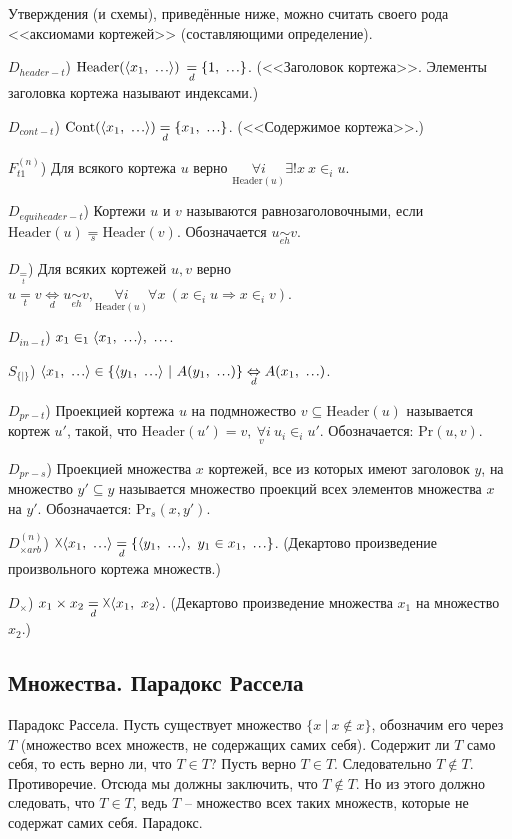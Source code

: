 \documentclass[a4paper]{article}
\newcommand\mydots{\hbox to 1em{.\hss.\hss.}}
\newcommand{\Def}[0]{\underset{d}{\Leftrightarrow}}
\newcommand{\defeq}[0]{\underset{d}{=}}
\newcommand{\eqs}[0]{\underset{s}{=}} %
\newcommand{\eqt}[0]{\underset{t}{=}} %
\newcommand{\Header}[1]{\mathrm{Header}(#1)}
\newcommand{\Cont}[1]{\mathrm{Cont}(#1)}
\newcommand{\Prmy}[2]{\mathrm{Pr}(#1, #2)}
\newcommand{\Prmys}[2]{\mathrm{Pr}_s(#1, #2)}
\begin{document}
Утверждения (и схемы), приведённые ниже, можно считать своего рода <<аксиомами кортежей>> (составляющими определение).

$D_{header-t}$) $\Header{\langle x_1,~ \mydots \rangle}$ $\defeq \{ 1,~ \mydots \}$. (<<Заголовок кортежа>>. Элементы заголовка кортежа называют индексами.)

$D_{cont-t}$) $\Cont{ \langle x_1,~ \mydots \rangle } \defeq \{ x_1,~ \mydots \}$. (<<Содержимое кортежа>>.)

$F_{t1}^{(n)}$) Для всякого кортежа $u$ верно $\underset{\Header{u}}{\forall i} \exists! x~ x \in_i u$.

$D_{equiheader-t}$) Кортежи $u$ и $v$ называются равнозаголовочными, если $\Header{u} \eqs \Header{v}$. Обозначается $u \underset{eh}{\sim} v$.

$D_{\eqt}$) Для всяких кортежей $u, v$ верно $u \eqt v \Def u \underset{eh}{\sim} v, \underset{\Header{u}}{\forall i} \forall x~ (x \in_i u \Rightarrow x \in_i v)$.

$D_{in-t}$) $x_1 \in_1 \langle x_1,~ \mydots \rangle,~ \mydots$.

$S_{\{ | \}}$) $\langle x_1,~ \mydots \rangle \in \{ \langle y_1,~ \mydots \rangle ~|~ A(y_1,~ \mydots) \} \Def A(x_1,~ \mydots)$.

$D_{pr-t}$) Проекцией кортежа $u$ на подмножество $v \subseteq \Header{u}$ называется кортеж $u'$, такой, что $\Header{u'} = v,~ \underset{v}{\forall} i~ u_i \in_i u'$. Обозначается: $\Prmy{u}{v}$.

$D_{pr-s}$) Проекцией множества $x$ кортежей, все из которых имеют заголовок $y$, на множество $y' \subseteq y$ называется множество проекций всех элементов множества $x$ на $y'$. Обозначается: $\Prmys{x}{y'}$.

$D^{(n)}_{\times arb}$) $\vartimes \langle x_1,~ \mydots \rangle \defeq \{ \langle y_1,~ \mydots \rangle,~ y_1 \in x_1,~ \mydots \}$. (Декартово произведение произвольного кортежа множеств.)

$D_\times$) $x_1 \times x_2 \defeq \vartimes \langle x_1,~ x_2 \rangle$. (Декартово произведение множества $x_1$ на множество $x_2$.)

\subsection{Множества. Парадокс Рассела}

Парадокс Рассела. Пусть существует множество $\{x ~|~ x \notin x\}$, обозначим его через $T$ (множество всех множеств, не содержащих самих себя). Содержит ли $T$ само себя, то есть верно ли, что $T \in T$? Пусть верно $T \in T$. Следовательно $T \notin T$. Противоречие. Отсюда мы должны заключить, что $T \notin T$. Но из этого должно следовать, что $T \in T$, ведь $T$ -- множество всех таких множеств, которые не содержат самих себя. Парадокс.
\end{document}
